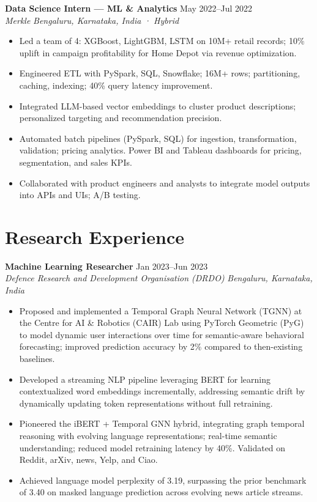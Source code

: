 \documentclass[11pt,a4paper]{article}
\newcommand{\cvEntry}[4]{\textbf{#1} \hfill #2 \\ \textit{#3} \hfill \textit{#4} \vspace{2pt}}
\newcommand{\cvItem}[1]{\item \small #1 \vspace{-1pt}}
\begin{document}
\cvEntry{Data Science Intern --- ML \& Analytics}{May 2022--Jul 2022}{Merkle}{Bengaluru, Karnataka, India · Hybrid}
\begin{itemize}[leftmargin=*,nosep]
  \cvItem{Led a team of 4: XGBoost, LightGBM, LSTM on 10M+ retail records; 10\% uplift in campaign profitability for Home Depot via revenue optimization.}
  \cvItem{Engineered ETL with PySpark, SQL, Snowflake; 16M+ rows; partitioning, caching, indexing; 40\% query latency improvement.}
  \cvItem{Integrated LLM-based vector embeddings to cluster product descriptions; personalized targeting and recommendation precision.}
  \cvItem{Automated batch pipelines (PySpark, SQL) for ingestion, transformation, validation; pricing analytics. Power BI and Tableau dashboards for pricing, segmentation, and sales KPIs.}
  \cvItem{Collaborated with product engineers and analysts to integrate model outputs into APIs and UIs; A/B testing.}
\end{itemize}
\vspace{4pt}


\section{Research Experience}

\cvEntry{Machine Learning Researcher}{Jan 2023--Jun 2023}{Defence Research and Development Organisation (DRDO)}{Bengaluru, Karnataka, India}
\begin{itemize}[leftmargin=*,nosep]
  \cvItem{Proposed and implemented a Temporal Graph Neural Network (TGNN) at the Centre for AI \& Robotics (CAIR) Lab using PyTorch Geometric (PyG) to model dynamic user interactions over time for semantic-aware behavioral forecasting; improved prediction accuracy by 2\% compared to then-existing baselines.}
  \cvItem{Developed a streaming NLP pipeline leveraging BERT for learning contextualized word embeddings incrementally, addressing semantic drift by dynamically updating token representations without full retraining.}
  \cvItem{Pioneered the iBERT + Temporal GNN hybrid, integrating graph temporal reasoning with evolving language representations; real-time semantic understanding; reduced model retraining latency by 40\%. Validated on Reddit, arXiv, news, Yelp, and Ciao.}
  \cvItem{Achieved language model perplexity of 3.19, surpassing the prior benchmark of 3.40 on masked language prediction across evolving news article streams.}
\end{itemize}
\vspace{4pt}
\end{document}
